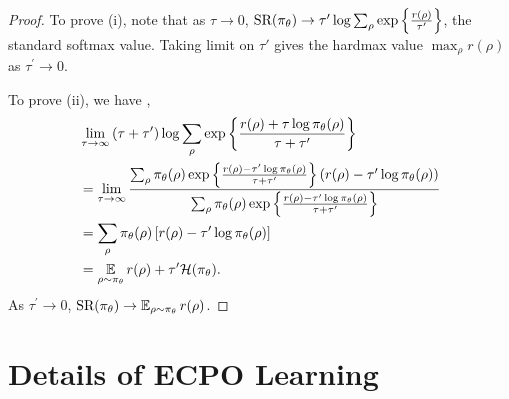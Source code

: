 \begin{proof}
To prove (i), note that as $\tau \to 0$, $\text{SR}(\pi_\theta) \to \tau^{\prime} \log{ \sum_{\rho}{ \exp\left\{ \frac{r(\rho) }{ \tau^{\prime} } \right\} }}$, the standard softmax value. Taking limit on $\tau'$ gives the hardmax value $\max_{\rho}{r(\rho)}$ as $\tau^{\prime} \to 0$.
	
To prove (ii), we have ,
\begin{align*}
	&\lim\limits_{\tau \to \infty}{ (\tau + \tau^{\prime})\log{ \sum_{\rho}{ \exp\left\{ \frac{r(\rho) + \tau \log{\pi_\theta(\rho)} }{\tau + \tau^{\prime}} \right\} }} } \\
	&= {\lim\limits_{\tau \to \infty}{ \frac{ \sum_{\rho}{ \pi_\theta(\rho) \exp\left\{ \frac{r(\rho) - \tau^{\prime} \log{\pi_\theta(\rho)} }{\tau + \tau^{\prime}} \right\} \left( r(\rho) - \tau^{\prime}\log{\pi_\theta(\rho)} \right) } }{  \sum_{\rho}{ \pi_\theta(\rho) \exp\left\{ \frac{r(\rho) - \tau^{\prime} \log{\pi_\theta(\rho)} }{\tau + \tau^{\prime}} \right\} } } } }\\
	&= \sum_{\rho}{ \pi_\theta(\rho) \left[ r(\rho) - \tau^{\prime}\log{\pi_\theta(\rho)} \right] } \\
	&= \operatorname*{\mathbb{E}}_{\rho \sim \pi_\theta}{r(\rho)} + \tau^{\prime} \mathcal{H}(\pi_\theta).
\end{align*}
	As $\tau^{\prime} \to 0$, $\text{SR}(\pi_\theta) \to \operatorname*{\mathbb{E}}_{\rho \sim \pi_\theta}{r(\rho)}$.
\end{proof}

\section{Details of ECPO Learning}
\label{appx:ECPO-learning}

